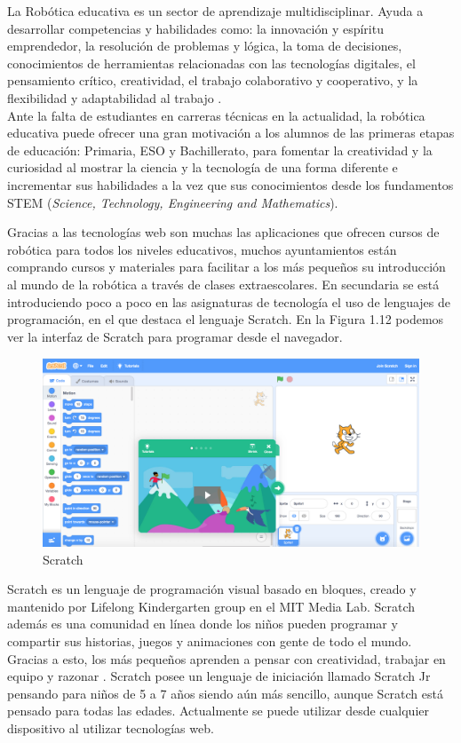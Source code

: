 La Robótica educativa es un sector de aprendizaje multidisciplinar. Ayuda a desarrollar competencias y habilidades como: la innovación y espíritu emprendedor, la resolución de problemas y lógica, la toma de decisiones, conocimientos de herramientas relacionadas con las tecnologías digitales, el pensamiento crítico, creatividad, el trabajo colaborativo y cooperativo, y  la flexibilidad y adaptabilidad al trabajo \cite{roboticaedu}.
\\
Ante la falta de estudiantes en carreras técnicas en la actualidad, la robótica educativa puede ofrecer una gran motivación a los alumnos de las primeras etapas de educación: Primaria, ESO y Bachillerato, para fomentar la creatividad y la curiosidad al mostrar la ciencia y la tecnología de una forma diferente e incrementar sus habilidades a la vez que sus conocimientos desde los fundamentos STEM (\textit{Science, Technology, Engineering and Mathematics}).

Gracias a las tecnologías web son muchas las aplicaciones que ofrecen cursos de robótica para todos los niveles educativos, muchos ayuntamientos están comprando cursos y materiales para facilitar a los más pequeños su introducción al mundo de la robótica a través de clases extraescolares. En secundaria se está introduciendo poco a poco en las asignaturas de tecnología el uso de lenguajes de programación, en el que destaca el lenguaje Scratch. En la Figura 1.12 podemos ver la interfaz de Scratch para programar desde el navegador.
\begin{figure}[H]
    \centering
    \includegraphics[width=0.8\columnwidth]{chapters/images/scratch.png}
    \caption{Scratch}
    \label{fig:my_label}
\end{figure}

Scratch es un lenguaje de programación visual basado en bloques, creado y mantenido por Lifelong Kindergarten group en el MIT Media Lab. Scratch además es una comunidad en línea donde los niños pueden programar y compartir sus historias, juegos y animaciones con gente de todo el mundo. Gracias a esto, los más pequeños aprenden a pensar con creatividad, trabajar en equipo y razonar \cite{scratch}. Scratch posee un lenguaje de iniciación llamado Scratch Jr pensando para niños de 5 a 7 años siendo aún más sencillo, aunque Scratch está pensado para todas las edades. Actualmente se puede utilizar desde cualquier dispositivo al utilizar tecnologías web.

